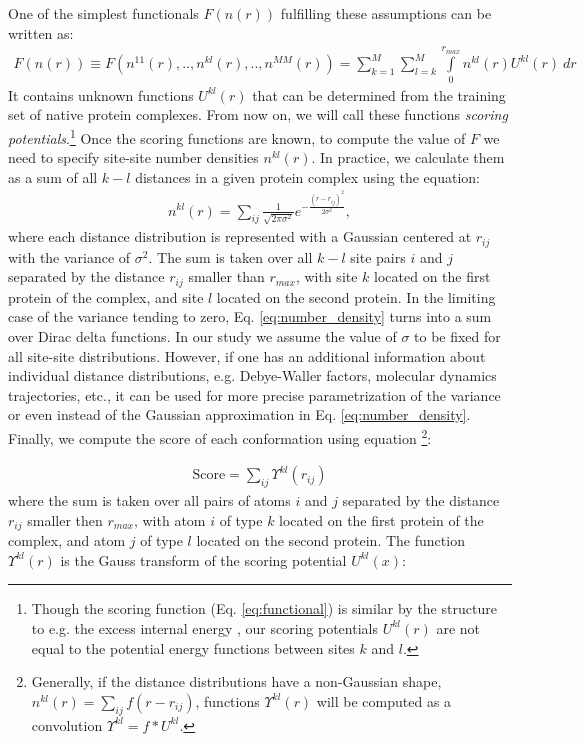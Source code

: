 One of the simplest functionals $F(n(r))$ fulfilling these assumptions can be written as:
\begin{eqnarray}
\label{eq:functional}
F(n(r))\equiv F(n^{11}(r),..,n^{kl}(r),..,n^{MM}(r)) = \sum_{k=1}^M \sum_{l=k}^M \int \limits_{0}^{r_{max}} n^{kl}(r)U^{kl}(r)~dr 
\end{eqnarray}
It contains unknown functions $U^{kl}(r)$ that can be determined from the training set of native protein complexes. 
From now on,  we will call these  functions \emph{scoring potentials}.\footnote{Though the scoring function (Eq. \ref{eq:functional}) is 
similar by the structure to e.g. the excess internal energy \cite{Hansen2006}, our scoring potentials $U^{kl}(r)$ are not equal to the 
potential energy functions between sites $k$ and $l$.} Once the scoring functions are known, to compute the value of $F$ we need to 
specify site-site number densities $n^{kl}(r)$. In practice, we calculate them as a sum of all $k-l$ distances in a given protein complex using the 
equation:
\begin{eqnarray}
n^{kl}(r) = \sum_{ij} \frac{1}{\sqrt{2\pi \sigma^2}} e^{-{\frac{(r-r_{ij})^2}{2\sigma^2}}}
,
\label{eq:number_density}
\end{eqnarray}
where each distance distribution is represented with a Gaussian  centered at $r_{ij}$ with the variance of $ \sigma ^ 2 $. 
The sum is taken over all $k-l$ site pairs $i$ and $j$ separated by the distance $r_{ij}$ smaller than $r_{max}$, with site $k$ located 
on the first protein of the complex, and site $l$ located on the second protein. In the limiting case of the variance tending to zero, 
Eq. \ref{eq:number_density} turns into a sum over Dirac delta functions. In our study we assume the value of $ \sigma $ to be fixed
for all site-site distributions. However, if one has an additional information about individual distance distributions, e.g. Debye-Waller factors,
 molecular dynamics trajectories, etc., it can be used for more precise parametrization of the variance or even instead of the Gaussian approximation
 in Eq. \ref{eq:number_density}. Finally, we compute the score of each conformation using equation 
\footnote{ Generally, 
if the distance distributions have a non-Gaussian shape, $n^{kl}(r) = \sum_{ij} f(r-r_{ij})$, functions $ \Upsilon^{kl}(r)$ will be computed as a 
convolution  $\Upsilon^{kl} =  f \ast U^{kl}$.}:

\begin{eqnarray}
\label{eq:scoring_1}
\mathrm{Score} =  \sum_{ij}  \Upsilon^{kl}(r_{ij}) 
\end{eqnarray}
where the sum is taken over all pairs of atoms $i$ and $j$ separated by the distance $r_{ij}$ 
smaller then $r_{max}$, with atom $i$ of type $k$ located on the first protein of the complex, and atom $j$ 
of type $l$ located on the second protein. The function $ \Upsilon^{kl}(r)$ is the Gauss transform of the scoring potential $U^{kl}(x)$:

